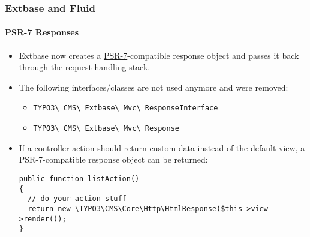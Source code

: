 %

\begin{frame}[fragile]
	\frametitle{Extbase and Fluid}
	\framesubtitle{PSR-7 Responses}

	\lstset{basicstyle=\tiny\ttfamily}

	\begin{itemize}
		\item Extbase now creates a
			\href{https://www.php-fig.org/psr/psr-7/}{PSR-7}-compatible
			response object and passes it back through the request handling stack.
		\item The following interfaces/classes are not used anymore and were removed:

			\begin{itemize}\smaller
				\item \texttt{TYPO3\textbackslash
					CMS\textbackslash
					Extbase\textbackslash
					Mvc\textbackslash
					ResponseInterface}
				\item \texttt{TYPO3\textbackslash
					CMS\textbackslash
					Extbase\textbackslash
					Mvc\textbackslash
					Response}
			\end{itemize}\normalsize

		\item If a controller action should return custom data instead of the
			default view, a PSR-7-compatible response object can be returned:
\begin{lstlisting}
public function listAction()
{
  // do your action stuff
  return new \TYPO3\CMS\Core\Http\HtmlResponse($this->view->render());
}
\end{lstlisting}
	\end{itemize}

\end{frame}


